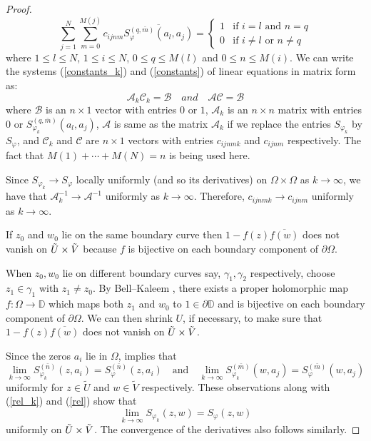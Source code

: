 \documentclass[11pt, reqno]{amsart}
\numberwithin{equation}{section}
\begin{document}
\begin{proof}
\begin{equation}
			\sum_{j=1}^N\sum_{m=0}^{M(j)}c_{ijnm}\overline{S_{\varphi}^{(q,\bar{m})}(a_l,a_j)}
			=
			\left\{
			\begin{array}{lr}
				1 & \text{if } i=l \text{ and } n=q \\
				0 & \text{if } i\neq l \text{ or } n\neq q
			\end{array}
			\right.
		\end{equation}
		where $1\leq l\leq N$, $1\leq i\leq N$, $0\leq q\leq M(l)$ and $0\leq n\leq M(i)$.
		We can write the systems (\ref{constants_k}) and (\ref{constants}) of linear equations in matrix form as:
		\[
		\mathcal{A}_k\mathcal{C}_k = \mathcal{B}
		\quad {and} \quad
		\mathcal{A} \mathcal{C} = \mathcal{B}
		\]
		where $\mathcal{B}$ is an $n\times 1$ vector with entries $0$ or $1$, $\mathcal{A}_k$ is an $n\times n$ matrix with entries $0$ or $S_{\varphi_k}^{(q,\bar{m})}(a_l,a_j)$, 
		$\mathcal{A}$ is same as the matrix $\mathcal{A}_k$ if we replace the entries $S_{\varphi_k}$ by $S_{\varphi}$, and 
		$\mathcal{C}_k$ and $\mathcal{C}$ are $n\times 1$ vectors with entries $c_{ijnmk}$ and $c_{ijnm}$ respectively. The fact that $M(1) + \cdots +M(N) = n$ is being used here.
		
		\medskip
		
		Since $S_{\varphi_k}\rightarrow S_{\varphi}$ locally uniformly (and so its derivatives) on $\Omega\times\Omega$ as $k\rightarrow\infty$, we have that $\mathcal{A}_k^{-1}\rightarrow\mathcal{A}^{-1}$ uniformly as $k\rightarrow\infty$. Therefore, $c_{ijnmk}\rightarrow c_{ijnm}$ uniformly as $k\rightarrow\infty$.

        \medskip
		
		If $z_0$ and $w_0$ lie on the same boundary curve then $1-f(z)\overline{f(w)}$ does not vanish on $\Tilde{U}\times\Tilde{V}$ because $f$ is bijective on each boundary component of $\partial \Omega$. 

        \medskip
        
        When $z_0,w_0$ lie on different boundary curves say, $\gamma_1, \gamma_2$ respectively,  choose $z_1\in \gamma_1$ with $z_1\neq z_0$. By Bell--Kaleem \cite{BeKf}, there exists a proper holomorphic map $f: \Omega \rightarrow \mathbb D$ which maps both $z_1$ and $w_0$ to $1 \in \partial \mathbb D$ and is bijective on each boundary component of $\partial \Omega$. We can then shrink $U$, if necessary, to make sure that $1-f(z)\overline{f(w)}$ does not vanish on $\Tilde{U}\times\Tilde{V}$. 
        
		
		\medskip
		
		Since the zeros $a_i$ lie in $\Omega$, \cite{JV} implies that
		\[
		\lim_{k\rightarrow\infty}S_{\varphi_k}^{(\bar{n})}(z,a_i)= S_{\varphi}^{(\bar{n})}(z,a_i)
		\quad
		\text{and}
		\quad
		\lim_{k\rightarrow\infty}S_{\varphi_k}^{(\bar{m})}(w,a_j)= S_{\varphi}^{(\bar{m})}(w,a_j)
		\]
		uniformly for $z\in \tilde{U}$ and $w\in\tilde{V}$ respectively. These observations along with (\ref{rel_k}) and (\ref{rel}) show that 
		\[
		\lim_{k\rightarrow\infty}S_{\varphi_k}(z,w) = S_{\varphi}(z,w)
		\]
		uniformly on $\Tilde{U}\times \Tilde{V}$. The convergence of the derivatives also follows similarly.  
	\end{proof} 
	
\end{document}
